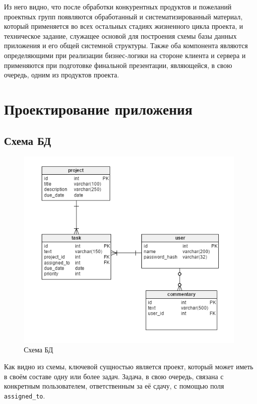 \documentclass[a4paper, 14pt]{extarticle}
\begin{document}
Из него видно, что после обработки конкурентных продуктов и пожеланий проектных групп появляются обработанный и систематизированный материал, который применяется во всех остальных стадиях жизненного цикла проекта, и техническое задание, служащее основой для построения схемы базы данных приложения и его общей системной структуры. Также оба компонента являются определяющими при реализации бизнес-логики на стороне клиента и сервера и применяются при подготовке финальной презентации, являющейся, в свою очередь, одним из продуктов проекта.

\newpage


\section{Проектирование приложения}
\subsection{Схема БД}

\begin{figure}[!htb]
  \centering
    \includegraphics[scale=0.6]{../shared_images/schema.png}
   \caption{Схема БД}
    \label{fig:start}
\end{figure}

Как видно из схемы, ключевой сущностью является проект, который может иметь в своём составе одну или более задач. Задача, в свою очередь, связана с конкретным пользователем, ответственным за её сдачу, с помощью поля {\tt assigned\_to}.
\end{document}
